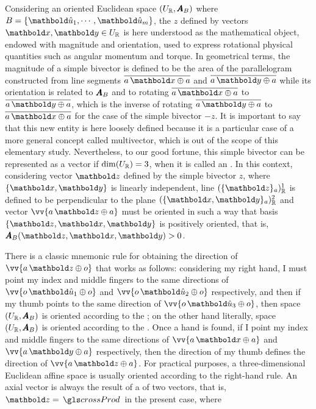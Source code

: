 Considering an oriented Euclidean space $(U_{\mathbb{R}},\pmb{A}_B)$ where $B=\{\vun{u}_1,\cdots,\vun{u}_m\}$, the  $z$ defined by vectors $\vto{x},\vto{y}\in U_\real$ is here understood as the mathematical object, endowed with magnitude and orientation, used to express rotational physical quantities such as angular momentum and torque. In geometrical terms, the magnitude of a simple bivector is defined to be the area of the parallelogram constructed from line segments $\overline{a\,\vto{x}\oplus a}$ and $\overline{a\,\vto{y}\oplus a}$ while its orientation is related to $\pmb{A}_B$ and to rotating $\overline{a\,\vto{x}\oplus a}$ to $\overline{a\,\vto{y}\oplus a}$, which is the inverse of rotating $\overline{a\,\vto{y}\oplus a}$ to $\overline{a\,\vto{x}\oplus a}$ for the case of the simple bivector $-z$. It is important to say that this new entity is here loosely defined because it is a particular case of a more general concept called multivector, which is out of the scope of this elementary study. Nevertheless, to our good fortune, this simple bivector can be represented as a vector if $\dim(U_{\mathbb{R}})=3$, when it is called an . In this context, considering vector $\vto{z}$ defined by the simple bivector $z$, where $\{\vto{x},\vto{y}\}$ is linearly independent, line $(\{\vto{z}\}_a)_\real^1$ is defined to be perpendicular to the plane $(\{\vto{x},\vto{y}\}_a)_\real^2$ and vector $\vv{a\,\vto{z}\oplus a}$ must be oriented in such a way that basis $\{\vto{z},\vto{x},\vto{y}\}$ is positively oriented, that is, $\fua{\tnr{A}_B}{\vto{z},\vto{x},\vto{y}}>0$.
\begin{figure}[!ht]
\centering
\begin{center}
\scalebox{.72}{}
\end{center}
\label{fg:axial}
\end{figure}
There is a classic mnemonic rule for obtaining the direction of $\vv{a\,\vto{z}\oplus o}$ that works as follows: considering my right hand, I must point my index and middle fingers to the same directions of $\vv{o\,\vun{u}_1\oplus o}$ and $\vv{o\,\vun{u}_2\oplus o}$ respectively, and then if my thumb points to the same direction of $\vv{o\,\vun{u}_3\oplus o}$, then space $(U_{\mathbb{R}},\pmb{A}_B)$ is oriented according to the ; on the other hand literally, space $(U_{\mathbb{R}},\pmb{A}_B)$ is oriented according to the . Once a hand is found, if I point my index and middle fingers to the same directions of $\vv{a\,\vto{x}\oplus a}$ and $\vv{a\,\vto{y}\oplus a}$ respectively, then the direction of my thumb defines the direction of $\vv{a\,\vto{z}\oplus a}$. For practical purposes, a three-dimensional Euclidean affine space is usually oriented according to the right-hand rule. An axial vector is always the result of a  of two vectors, that is, $\vto{z}=\gloref{crossProd}$ in the present case, where
